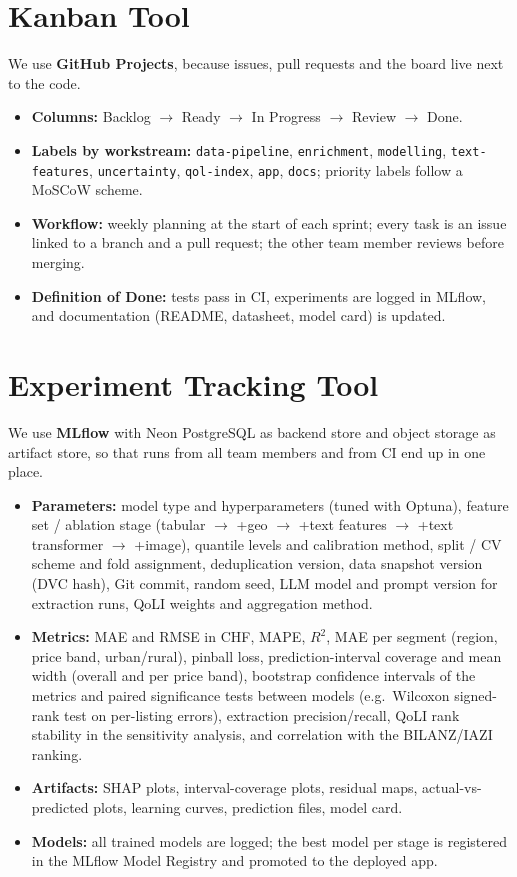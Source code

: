 \documentclass[11pt,a4paper]{article}
\begin{document}
\section{Kanban Tool}
We use \textbf{GitHub Projects}, because issues, pull requests and the board live next to the code.
\begin{itemize}
    \item \textbf{Columns:} Backlog $\rightarrow$ Ready $\rightarrow$ In Progress $\rightarrow$ Review $\rightarrow$ Done.
    \item \textbf{Labels by workstream:} \texttt{data-pipeline}, \texttt{enrichment}, \texttt{modelling}, \texttt{text-features}, \texttt{uncertainty}, \texttt{qol-index}, \texttt{app}, \texttt{docs}; priority labels follow a MoSCoW scheme.
    \item \textbf{Workflow:} weekly planning at the start of each sprint; every task is an issue linked to a branch and a pull request; the other team member reviews before merging.
    \item \textbf{Definition of Done:} tests pass in CI, experiments are logged in MLflow, and documentation (README, datasheet, model card) is updated.
\end{itemize}

\section{Experiment Tracking Tool}
We use \textbf{MLflow} with Neon PostgreSQL as backend store and object storage as artifact store, so that runs from all team members and from CI end up in one place.
\begin{itemize}
    \item \textbf{Parameters:} model type and hyperparameters (tuned with Optuna), feature set / ablation stage (tabular $\rightarrow$ +geo $\rightarrow$ +text features $\rightarrow$ +text transformer $\rightarrow$ +image), quantile levels and calibration method, split / CV scheme and fold assignment, deduplication version, data snapshot version (DVC hash), Git commit, random seed, LLM model and prompt version for extraction runs, QoLI weights and aggregation method.
    \item \textbf{Metrics:} MAE and RMSE in CHF, MAPE, $R^2$, MAE per segment (region, price band, urban/rural), pinball loss, prediction-interval coverage and mean width (overall and per price band), bootstrap confidence intervals of the metrics and paired significance tests between models (e.g.\ Wilcoxon signed-rank test on per-listing errors), extraction precision/recall, QoLI rank stability in the sensitivity analysis, and correlation with the BILANZ/IAZI ranking.
    \item \textbf{Artifacts:} SHAP plots, interval-coverage plots, residual maps, actual-vs-predicted plots, learning curves, prediction files, model card.
    \item \textbf{Models:} all trained models are logged; the best model per stage is registered in the MLflow Model Registry and promoted to the deployed app.
\end{itemize}
\end{document}
